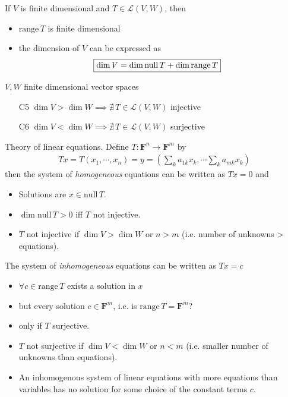 \documentclass[11pt,notitlepage,oneside]{article}
\DeclareMathOperator{\dimension}{dim}
\newcommand{\nullspace}[1]{\mathrm{null}\,{#1}}
\newcommand{\rangespace}[1]{\mathrm{range}\,{#1}}
\begin{document}
\begin{description}
  \item[T4] If $V$ is finite dimensional and $T\in\mathcal{L}(V,W)$, then
  \begin{itemize}
  \item $\rangespace{T}$ is finite dimensional
  \item the dimension of $V$ can be expressed as
  \begin{align*}
  \Aboxed{\dim{V} = \dimension{\nullspace{T}} + \dimension{\rangespace{T}}}
  \end{align*}
  \end{itemize}
  \item$V,W$ finite dimensional vector spaces
  \begin{itemize}
  \item[C5] $\dimension{V} > \dimension{W} \implies \nexists\,T\in\mathcal{L}(V,W)$ injective
  \item[C6] $\dimension{V} < \dimension{W} \implies \nexists\,T\in\mathcal{L}(V,W)$ surjective
  \end{itemize}
  \item Theory of linear equations. Define $T:\mathbf{F}^n\to\mathbf{F}^m$ by 
  \begin{align*}
  Tx = T(x_1,\cdots,x_n) = y = (\sum_k a_{1k}x_k, \cdots \sum_k a_{mk}x_k)
  \end{align*}
  then the system of \emph{homogeneous} equations can be written as $Tx=0$ and
  \begin{itemize}
  \item Solutions are $x\in\nullspace{T}$.
  \item $\dimension{\nullspace{T}}>0$ iff $T$ not injective.
  \item  $T$ not injective if $\dimension{V} > \dimension{W}$ or $n>m$ (i.e. number of unknowns > equations).
  \end{itemize}
  The system of \emph{inhomogeneous} equations can be written as $Tx=c$
  \begin{itemize}
  \item $\forall c\in\rangespace{T}$ exists a solution in $x$
  \item but every solution $c\in \mathbf{F}^m$, i.e. is $\rangespace{T}=\mathbf{F}^m$?
  \item only if $T$ surjective.
  \item $T$ not surjective if $\dimension{V} < \dimension{W}$ or $n<m$ (i.e. smaller number of unknowns than equations).
  \item An inhomogenous system of linear equations with more equations than variables has no solution for some choice of the constant terms $c$.

\end{itemize}
\end{description}
\end{document}
